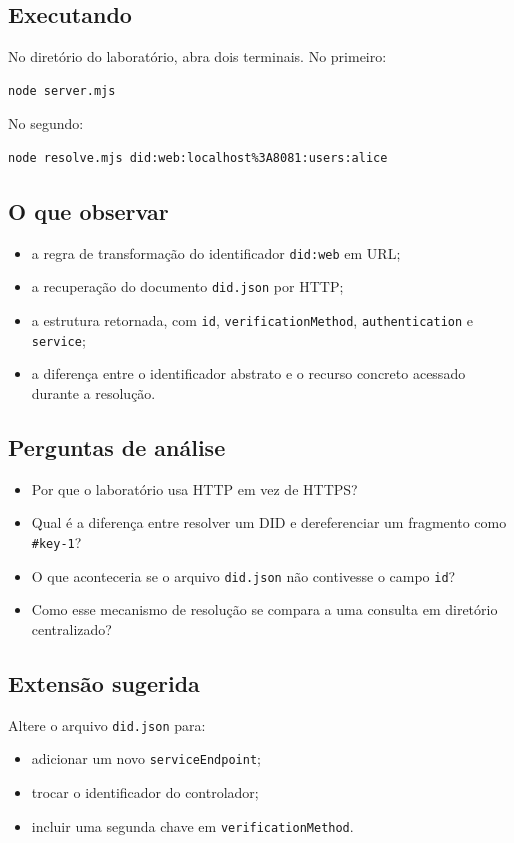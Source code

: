 \subsection{Executando}
No diretório do laboratório, abra dois terminais. No primeiro:
\begin{verbatim}
node server.mjs
\end{verbatim}

No segundo:
\begin{verbatim}
node resolve.mjs did:web:localhost%3A8081:users:alice
\end{verbatim}

\subsection{O que observar}
\begin{itemize}[leftmargin=*]
  \item a regra de transformação do identificador \texttt{did:web} em URL;
  \item a recuperação do documento \texttt{did.json} por HTTP;
  \item a estrutura retornada, com \texttt{id}, \texttt{verificationMethod}, \texttt{authentication} e \texttt{service};
  \item a diferença entre o identificador abstrato e o recurso concreto acessado durante a resolução.
\end{itemize}

\subsection{Perguntas de análise}
\begin{itemize}[leftmargin=*]
  \item Por que o laboratório usa HTTP em vez de HTTPS?
  \item Qual é a diferença entre resolver um DID e dereferenciar um fragmento como \texttt{\#key-1}?
  \item O que aconteceria se o arquivo \texttt{did.json} não contivesse o campo \texttt{id}?
  \item Como esse mecanismo de resolução se compara a uma consulta em diretório centralizado?
\end{itemize}

\subsection{Extensão sugerida}
Altere o arquivo \texttt{did.json} para:
\begin{itemize}[leftmargin=*]
  \item adicionar um novo \texttt{serviceEndpoint};
  \item trocar o identificador do controlador;
  \item incluir uma segunda chave em \texttt{verificationMethod}.
\end{itemize}

